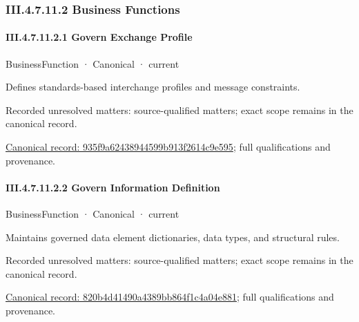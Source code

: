 \subsubsection*{III.4.7.11.2 Business Functions}
\label{navigation:III.4.7.11.2}

\paragraph*{III.4.7.11.2.1 Govern Exchange Profile}
\label{navigation:III.4.7.11.2.1}

\label{element:935f9a62438944599b913f2614c9e595}
{\small BusinessFunction · Canonical · current}\par

Defines standards-based interchange profiles and message constraints.


{\small Recorded unresolved matters: source-qualified matters; exact scope remains in the canonical record.}\par
{\footnotesize \href{../../../../../../../continuum/business/business-function/935f9a62438944599b913f2614c9e595.md}{Canonical record: 935f9a62438944599b913f2614c9e595}; full qualifications and provenance.}\par
\paragraph*{III.4.7.11.2.2 Govern Information Definition}
\label{navigation:III.4.7.11.2.2}

\label{element:820b4d41490a4389bb864f1c4a04e881}
{\small BusinessFunction · Canonical · current}\par

Maintains governed data element dictionaries, data types, and structural rules.


{\small Recorded unresolved matters: source-qualified matters; exact scope remains in the canonical record.}\par
{\footnotesize \href{../../../../../../../continuum/business/business-function/820b4d41490a4389bb864f1c4a04e881.md}{Canonical record: 820b4d41490a4389bb864f1c4a04e881}; full qualifications and provenance.}\par

